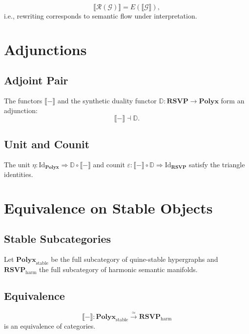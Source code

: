 \[
\llbracket \mathcal{R}(\mathcal{G}) \rrbracket
=
E(\llbracket \mathcal{G} \rrbracket),
\]
i.e., rewriting corresponds to semantic flow under interpretation.

\section{Adjunctions}

\subsection{Adjoint Pair}

The functors $\llbracket - \rrbracket$ and the synthetic duality functor $\mathbb{D}:\mathbf{RSVP}\to\mathbf{Polyx}$ form an adjunction:
\[
\llbracket - \rrbracket \dashv \mathbb{D}.
\]

\subsection{Unit and Counit}

The unit $\eta:\mathrm{Id}_{\mathbf{Polyx}}\Rightarrow \mathbb{D}\circ\llbracket - \rrbracket$  
and counit $\varepsilon:\llbracket - \rrbracket\circ \mathbb{D}\Rightarrow \mathrm{Id}_{\mathbf{RSVP}}$  
satisfy the triangle identities.

\section{Equivalence on Stable Objects}

\subsection{Stable Subcategories}

Let $\mathbf{Polyx}_{\mathrm{stable}}$ be the full subcategory of quine-stable hypergraphs and
$\mathbf{RSVP}_{\mathrm{harm}}$ the full subcategory of harmonic semantic manifolds.

\subsection{Equivalence}

\[
\llbracket - \rrbracket :
\mathbf{Polyx}_{\mathrm{stable}}
\stackrel{\simeq}{\longrightarrow}
\mathbf{RSVP}_{\mathrm{harm}}
\]
is an equivalence of categories.


